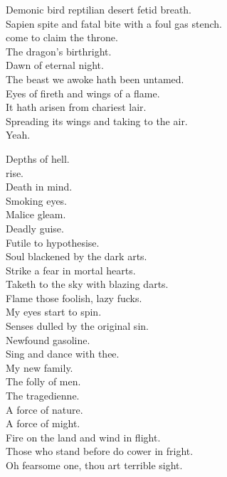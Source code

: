 Demonic bird reptilian desert fetid breath. \\
Sapien spite and fatal bite with a foul gas stench. \\
 come to claim the throne. \\
The dragon's birthright. \\
Dawn of eternal night. \\

The beast we awoke hath been untamed. \\
Eyes of fireth and wings of a flame. \\
It hath arisen from chariest lair. \\
Spreading its wings and taking to the air. \\

Yeah. \\



Depths of hell. \\
 rise. \\
Death in mind. \\
Smoking eyes. \\
Malice gleam. \\
Deadly guise. \\
Futile to hypothesise. \\
Soul blackened by the dark arts. \\
Strike a fear in mortal hearts. \\
Taketh to the sky with blazing darts. \\
Flame those foolish, lazy fucks. \\

My eyes start to spin. \\
Senses dulled by the original sin. \\
Newfound gasoline. \\
Sing and dance with thee. \\
My new family. \\
The folly of men. \\
The tragedienne. \\
A force of nature. \\
A force of might. \\
Fire on the land and wind in flight. \\
Those who stand before do cower in fright. \\
Oh fearsome one, thou art terrible sight. \\

